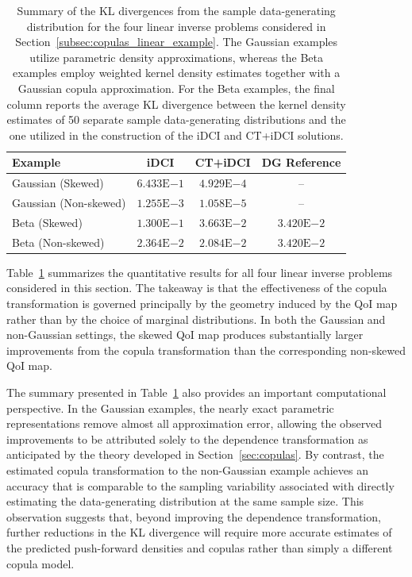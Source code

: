 \documentclass{article}
\newcounter{example}[section]
\newcommand{\expnumber}[2]{{#1}\mathrm{E}{#2}}
\begin{document}
\begin{table}[ht]
\centering
\caption{Summary of the KL divergences from the sample data-generating distribution for the four linear inverse problems considered in Section~\ref{subsec:copulas_linear_example}.
The Gaussian examples utilize parametric density approximations, whereas the Beta examples employ weighted kernel density estimates together with a Gaussian copula approximation.
For the Beta examples, the final column reports the average KL divergence between the kernel density estimates of 50 separate sample data-generating distributions and the one utilized in the construction of the iDCI and CT+iDCI solutions.}
\label{tab:linear_examples}

\begin{tabular}{l|c|c|c}
\toprule
Example &
iDCI &
CT+iDCI &
DG Reference \\
\midrule
Gaussian (Skewed)
&
$\expnumber{6.433}{-1}$
&
$\expnumber{4.929}{-4}$
&
-- \\
\hline
Gaussian (Non-skewed)
&
$\expnumber{1.255}{-3}$
&
$\expnumber{1.058}{-5}$
&
-- \\
\hline
Beta (Skewed)
&
$\expnumber{1.300}{-1}$
&
$\expnumber{3.663}{-2}$
&
$\expnumber{3.420}{-2}$ \\
\hline
Beta (Non-skewed)
&
$\expnumber{2.364}{-2}$
&
$\expnumber{2.084}{-2}$
&
$\expnumber{3.420}{-2}$ \\

\bottomrule
\end{tabular}
\end{table}

Table~\ref{tab:linear_examples} summarizes the quantitative results for all four linear inverse problems considered in this section.
The takeaway is that the effectiveness of the copula transformation is governed principally by the geometry induced by the QoI map rather than by the choice of marginal distributions. In both the Gaussian and non-Gaussian settings, the skewed QoI map produces substantially larger improvements from the copula transformation than the corresponding non-skewed QoI map.

The summary presented in Table~\ref{tab:linear_examples} also provides an important computational perspective.
In the Gaussian examples, the nearly exact parametric representations remove almost all approximation error, allowing the observed improvements to be attributed solely to the dependence transformation as anticipated by the theory developed in Section~\ref{sec:copulas}.
By contrast, the estimated copula transformation to the non-Gaussian example achieves an accuracy that is comparable to the sampling variability associated with directly estimating the data-generating distribution at the same sample size.
This observation suggests that, beyond improving the dependence transformation, further reductions in the KL divergence will require more accurate estimates of the predicted push-forward densities and copulas rather than simply a different copula model.
\end{document}
